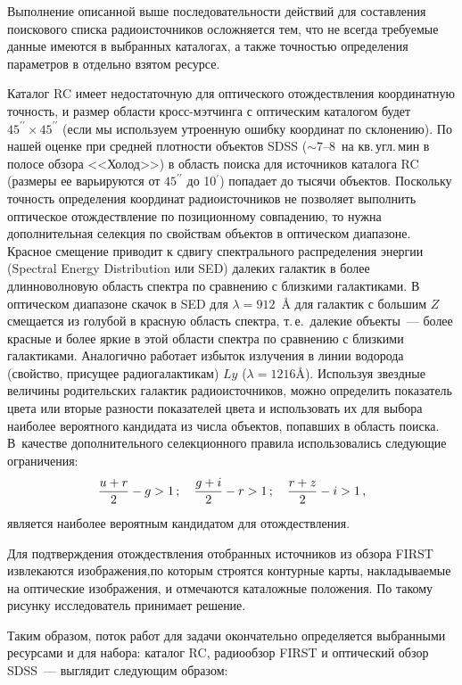 \begin{multicols}{2}
Выполнение описанной выше последовательности действий для составления поискового
списка радиоисточников осложняется тем, что не всегда требуемые данные имеются в
выбранных каталогах, а
также точностью определения параметров в отдельно взятом ресурсе.

     Каталог RC имеет недостаточную для оптического отождествления координатную
точность, и размер области кросс-мэтчинга с оптическим каталогом будет
$45^{\prime\prime} \times 45^{\prime\prime}$ (если мы используем утроенную ошибку
координат по склонению). По нашей оценке при средней плотности объектов SDSS ($\sim
7\mbox{--}8$~на кв.\,угл.\,мин в полосе обзора <<Холод>>) в область поиска для
источников каталога RC (размеры ее варьируются от $45^{\prime\prime}$ до 10$^\prime$)
попадает до тысячи объектов. Поскольку точность определения
координат радиоисточников не
позволяет выполнить оптическое отождествление по позиционному совпадению,
то нужна дополнительная селекция по свойствам объектов
в оптическом диапазоне. Красное смещение приводит к сдвигу
спектрального распределения энергии (Spectral Energy Distribution или SED) далеких
галактик в более длинноволновую область спектра по сравнению с
близкими галактиками. В оптическом диапазоне скачок в SED для 
$\lambda = 912$~{\ptb\AA}
для галактик с большим $Z$ смещается из голубой в красную область
спектра, т.\,е.\ далекие объекты~--- более красные и более яркие в этой
области спектра по сравнению с близкими галактиками. Аналогично
работает избыток излучения в линии водорода (свойство, присущее
радиогалактикам) $Ly$ ($\lambda = 1216${\ptb\AA}). Используя
звездные величины
родительских галактик ра\-дио\-ис\-точ\-ни\-ков, можно определить показатель
цвета или вторые разности показателей цвета и использовать их для
выбора наиболее вероятного кандидата из числа объектов, попавших в
область поиска. В~качестве дополнительного селекционного правила
использовались следующие ограничения:
$$
\displaystyle\frac{\displaystyle u+r\mathstrut}{\displaystyle 2\mathstrut} - g > 1\,;\quad \displaystyle\frac{\displaystyle g+i\mathstrut}{\displaystyle 2\mathstrut}- r > 1\,;\quad \displaystyle\frac{\displaystyle r+z\mathstrut}{\displaystyle 2\mathstrut} - i > 1\,,
$$
     является наиболее вероятным кандидатом для отож\-дествления.

Для подтверждения отождествления отобранных источников из обзора FIRST извлекаются
 изоб\-ра\-же\-ния,по которым строятся контурные карты, накладываемые на
оптические изоб\-ра\-же\-ния, и отмечаются каталожные положения. По такому рисунку
исследователь принимает решение.

     Таким образом, поток работ для задачи окончательно определяется выбранными
ресурсами и для набора: каталог RC, радиообзор FIRST и оптический обзор SDSS~---
выглядит следующим образом:


\end{multicols}
